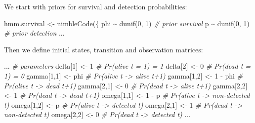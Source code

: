 \documentclass[
  12pt,
]{krantz}
\newenvironment{Shaded}{\begin{snugshade}}{\end{snugshade}}
\newcommand{\CommentTok}[1]{\textcolor[rgb]{0.56,0.35,0.01}{\textit{#1}}}
\newcommand{\DecValTok}[1]{\textcolor[rgb]{0.00,0.00,0.81}{#1}}
\newcommand{\FunctionTok}[1]{\textcolor[rgb]{0.00,0.00,0.00}{#1}}
\newcommand{\NormalTok}[1]{#1}
\newcommand{\OtherTok}[1]{\textcolor[rgb]{0.56,0.35,0.01}{#1}}
\newcommand{\SpecialCharTok}[1]{\textcolor[rgb]{0.00,0.00,0.00}{#1}}
\begin{document}
We start with priors for survival and detection probabilities:

\begin{Shaded}
\begin{Highlighting}[]
\NormalTok{hmm.survival }\OtherTok{\textless{}{-}} \FunctionTok{nimbleCode}\NormalTok{(\{}
\NormalTok{  phi }\SpecialCharTok{\textasciitilde{}} \FunctionTok{dunif}\NormalTok{(}\DecValTok{0}\NormalTok{, }\DecValTok{1}\NormalTok{) }\CommentTok{\# prior survival}
\NormalTok{  p }\SpecialCharTok{\textasciitilde{}} \FunctionTok{dunif}\NormalTok{(}\DecValTok{0}\NormalTok{, }\DecValTok{1}\NormalTok{) }\CommentTok{\# prior detection}
\NormalTok{...}
\end{Highlighting}
\end{Shaded}

Then we define initial states, transition and observation matrices:

\begin{Shaded}
\begin{Highlighting}[]
\NormalTok{...}
  \CommentTok{\# parameters}
\NormalTok{  delta[}\DecValTok{1}\NormalTok{] }\OtherTok{\textless{}{-}} \DecValTok{1}          \CommentTok{\# Pr(alive t = 1) = 1}
\NormalTok{  delta[}\DecValTok{2}\NormalTok{] }\OtherTok{\textless{}{-}} \DecValTok{0}          \CommentTok{\# Pr(dead t = 1) = 0}
\NormalTok{  gamma[}\DecValTok{1}\NormalTok{,}\DecValTok{1}\NormalTok{] }\OtherTok{\textless{}{-}}\NormalTok{ phi      }\CommentTok{\# Pr(alive t {-}\textgreater{} alive t+1)}
\NormalTok{  gamma[}\DecValTok{1}\NormalTok{,}\DecValTok{2}\NormalTok{] }\OtherTok{\textless{}{-}} \DecValTok{1} \SpecialCharTok{{-}}\NormalTok{ phi  }\CommentTok{\# Pr(alive t {-}\textgreater{} dead t+1)}
\NormalTok{  gamma[}\DecValTok{2}\NormalTok{,}\DecValTok{1}\NormalTok{] }\OtherTok{\textless{}{-}} \DecValTok{0}        \CommentTok{\# Pr(dead t {-}\textgreater{} alive t+1)}
\NormalTok{  gamma[}\DecValTok{2}\NormalTok{,}\DecValTok{2}\NormalTok{] }\OtherTok{\textless{}{-}} \DecValTok{1}        \CommentTok{\# Pr(dead t {-}\textgreater{} dead t+1)}
\NormalTok{  omega[}\DecValTok{1}\NormalTok{,}\DecValTok{1}\NormalTok{] }\OtherTok{\textless{}{-}} \DecValTok{1} \SpecialCharTok{{-}}\NormalTok{ p    }\CommentTok{\# Pr(alive t {-}\textgreater{} non{-}detected t)}
\NormalTok{  omega[}\DecValTok{1}\NormalTok{,}\DecValTok{2}\NormalTok{] }\OtherTok{\textless{}{-}}\NormalTok{ p        }\CommentTok{\# Pr(alive t {-}\textgreater{} detected t)}
\NormalTok{  omega[}\DecValTok{2}\NormalTok{,}\DecValTok{1}\NormalTok{] }\OtherTok{\textless{}{-}} \DecValTok{1}        \CommentTok{\# Pr(dead t {-}\textgreater{} non{-}detected t)}
\NormalTok{  omega[}\DecValTok{2}\NormalTok{,}\DecValTok{2}\NormalTok{] }\OtherTok{\textless{}{-}} \DecValTok{0}        \CommentTok{\# Pr(dead t {-}\textgreater{} detected t)}
\NormalTok{...}
\end{Highlighting}
\end{Shaded}
\end{document}
